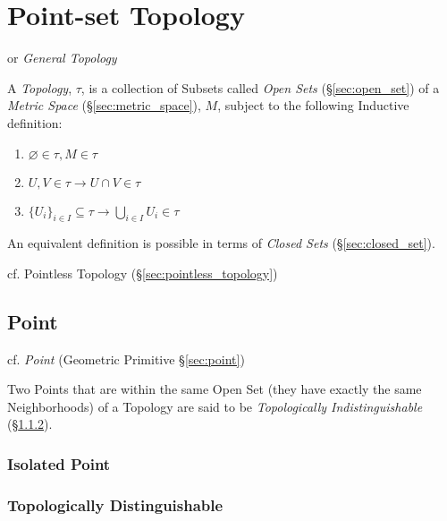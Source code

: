 \section{Point-set Topology}\label{sec:pointset_topology}

or \emph{General Topology}

A \emph{Topology}, $\tau$, is a collection of Subsets called
\emph{Open Sets} (\S\ref{sec:open_set}) of a \emph{Metric Space}
(\S\ref{sec:metric_space}), $M$, subject to the following Inductive
definition:
\begin{enumerate}
\item $\varnothing \in \tau, M \in \tau$
\item $U,V \in \tau \rightarrow U \cap V \in \tau$
\item $\{U_i\}_{i \in I} \subseteq \tau \rightarrow \bigcup_{i \in I}
  U_i \in \tau$
\end{enumerate}

An equivalent definition is possible in terms of \emph{Closed Sets}
(\S\ref{sec:closed_set}).

\fist cf. Pointless Topology (\S\ref{sec:pointless_topology})



\subsection{Point}\label{sec:topological_point}

cf. \emph{Point} (Geometric Primitive \S\ref{sec:point})

Two Points that are within the same Open Set (they have exactly the
same Neighborhoods) of a Topology are said to be \emph{Topologically
  Indistinguishable} (\S\ref{sec:topologically_distinguishable}).



\subsubsection{Isolated Point}\label{sec:isolated_point}

\subsubsection{Topologically Distinguishable}
\label{sec:topologically_distinguishable}


